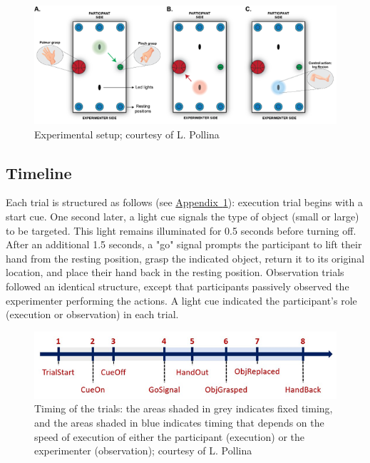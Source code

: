 \documentclass[10pt,conference,compsocconf]{IEEEtran}
\newcommand{\aref}[1]{\hyperref[#1]{Appendix~\ref*{#1}}}
\begin{document}
\begin{figure}[h!]
    \center
    \includegraphics[width=\linewidth]{images/2024-12-11-13-41-23.png}
    \caption{Experimental setup; courtesy of L. Pollina}
\end{figure}
\FloatBarrier

\subsection{Timeline}
\label{subsec:timeline}
Each trial is structured as follows (see \aref{appfig:timeline}): execution trial begins with a start cue. One second later, a light cue signals the type of object (small or large) to be targeted. This light remains illuminated for 0.5 seconds before turning off. After an additional 1.5 seconds, a "go" signal prompts the participant to lift their hand from the resting position, grasp the indicated object, return it to its original location, and place their hand back in the resting position. Observation trials followed an identical structure, except that participants passively observed the experimenter performing the actions. A light cue indicated the participant's role (execution or observation) in each trial.

\begin{figure}[h!]
    \center
    \includegraphics[width=\linewidth]{images/2024-12-11-13-41-48.png}
    \caption{Timing of the trials: the areas shaded in grey indicates fixed timing, and the areas shaded in blue indicates timing that depends on the speed of execution of either the participant (execution) or the experimenter (observation); courtesy of L. Pollina}
    \label{appfig:timeline}
\end{figure}
\FloatBarrier
\end{document}
